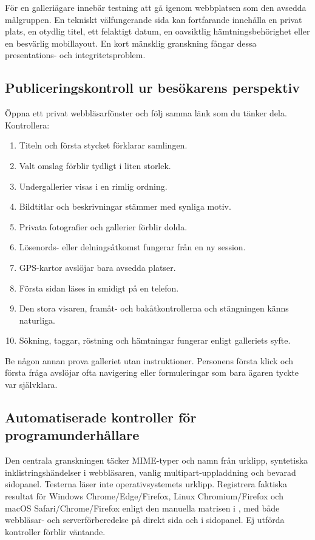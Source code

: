 \documentclass[11pt,a4paper]{article}
\newcommand{\filepath}[1]{\path{#1}}
\begin{document}
För en galleriägare innebär testning att gå igenom webbplatsen som den avsedda
målgruppen. En tekniskt välfungerande sida kan fortfarande innehålla en privat
plats, en otydlig titel, ett felaktigt datum, en oavsiktlig hämtningsbehörighet
eller en besvärlig mobillayout. En kort mänsklig granskning fångar dessa
presentations- och integritetsproblem.

\subsection{Publiceringskontroll ur besökarens perspektiv}

Öppna ett privat webbläsarfönster och följ samma länk som du tänker dela.
Kontrollera:

\begin{enumerate}
  \item Titeln och första stycket förklarar samlingen.
  \item Valt omslag förblir tydligt i liten storlek.
  \item Undergallerier visas i en rimlig ordning.
  \item Bildtitlar och beskrivningar stämmer med synliga motiv.
  \item Privata fotografier och gallerier förblir dolda.
  \item Lösenords- eller delningsåtkomst fungerar från en ny session.
  \item GPS-kartor avslöjar bara avsedda platser.
  \item Första sidan läses in smidigt på en telefon.
  \item Den stora visaren, framåt- och bakåtkontrollerna och stängningen känns
  naturliga.
  \item Sökning, taggar, röstning och hämtningar fungerar enligt galleriets
  syfte.
\end{enumerate}

Be någon annan prova galleriet utan instruktioner. Personens första klick och
första fråga avslöjar ofta navigering eller formuleringar som bara ägaren tyckte
var självklara.

\subsection{Automatiserade kontroller för programunderhållare}

Den centrala granskningen täcker MIME-typer och namn från urklipp, syntetiska
inklistringshändelser i webbläsaren, vanlig multipart-uppladdning och bevarad
sidopanel. Testerna läser inte operativsystemets urklipp. Registrera faktiska
resultat för Windows Chrome/Edge/Firefox, Linux Chromium/Firefox och macOS
Safari/Chrome/Firefox enligt den manuella matrisen i \filepath{TESTING.md}, med
både webbläsar- och serverförberedelse på direkt sida och i sidopanel. Ej
utförda kontroller förblir väntande.
\end{document}
